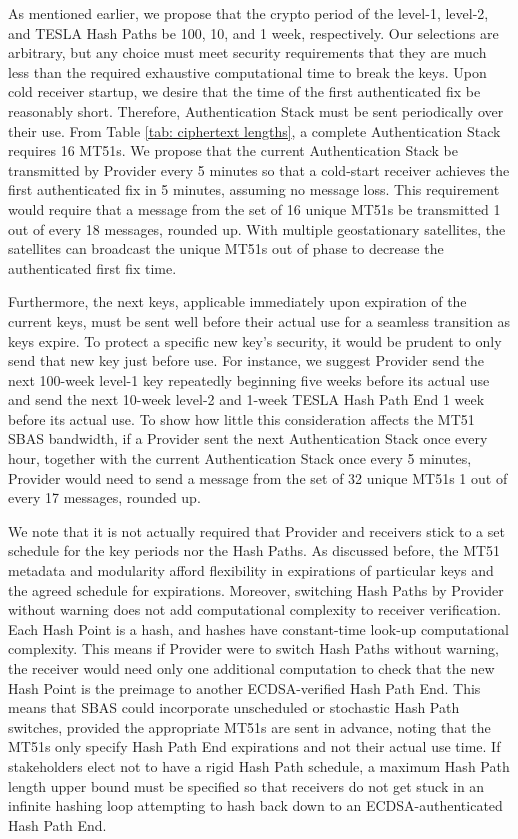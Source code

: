 \documentclass[letterpaper,times]{IONconf/IONconf}
\begin{document}
As mentioned earlier, we propose that the crypto period of the level-1, level-2, and TESLA Hash Paths be 100, 10, and 1 week, respectively.
Our selections are arbitrary, but any choice must meet security requirements that they are much less than the required exhaustive computational time to break the keys.
Upon cold receiver startup, we desire that the time of the first authenticated fix be reasonably short.
Therefore, Authentication Stack must be sent periodically over their use.
From Table \ref{tab: ciphertext lengths}, a complete Authentication Stack requires 16 MT51s. 
We propose that the current Authentication Stack be transmitted by Provider every 5 minutes so that a cold-start receiver achieves the first authenticated fix in 5 minutes, assuming no message loss.
This requirement would require that a message from the set of 16 unique MT51s be transmitted 1 out of every 18 messages, rounded up.
With multiple geostationary satellites, the satellites can broadcast the unique MT51s out of phase to decrease the authenticated first fix time.

Furthermore, the next keys, applicable immediately upon expiration of the current keys, must be sent well before their actual use for a seamless transition as keys expire.
To protect a specific new key's security, it would be prudent to only send that new key just before use.
For instance, we suggest Provider send the next 100-week level-1 key repeatedly beginning five weeks before its actual use and send the next 10-week level-2 and 1-week TESLA Hash Path End 1 week before its actual use.
To show how little this consideration affects the MT51 SBAS bandwidth, if a Provider sent the next Authentication Stack once every hour, together with the current Authentication Stack once every 5 minutes, Provider would need to send a message from the set of 32 unique MT51s 1 out of every 17 messages, rounded up.

We note that it is not actually required that Provider and receivers stick to a set schedule for the key periods nor the Hash Paths.
As discussed before, the MT51 metadata and modularity afford flexibility in expirations of particular keys and the agreed schedule for expirations.
Moreover, switching Hash Paths by Provider without warning does not add computational complexity to receiver verification.
Each Hash Point is a hash, and hashes have constant-time look-up computational complexity.
This means if Provider were to switch Hash Paths without warning, the receiver would need only one additional computation to check that the new Hash Point is the preimage to another ECDSA-verified Hash Path End.
This means that SBAS could incorporate unscheduled or stochastic Hash Path switches, provided the appropriate MT51s are sent in advance, noting that the MT51s only specify Hash Path End expirations and not their actual use time.
If stakeholders elect not to have a rigid Hash Path schedule, a maximum Hash Path length upper bound must be specified so that receivers do not get stuck in an infinite hashing loop attempting to hash back down to an ECDSA-authenticated Hash Path End.
\end{document}
